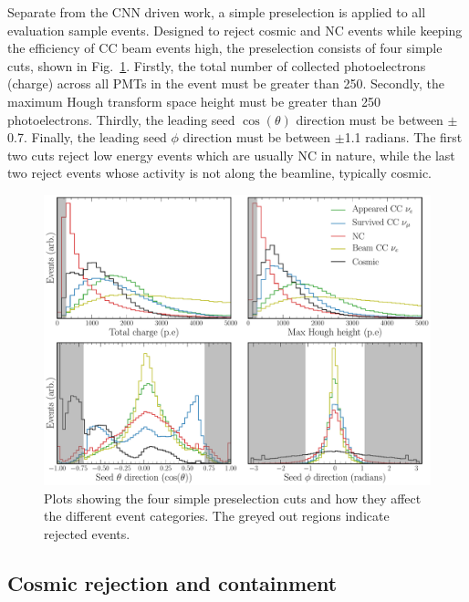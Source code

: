 Separate from the CNN driven work, a simple preselection is applied to all evaluation sample
events. Designed to reject cosmic and NC events while keeping the efficiency of CC beam events
high, the preselection consists of four simple cuts, shown in Fig.~\ref{fig:explore_simple_cuts}.
Firstly, the total number of collected photoelectrons (charge) across all PMTs in the event must
be greater than 250. Secondly, the maximum Hough transform space height must be greater than 250
photoelectrons. Thirdly, the leading seed $\cos(\theta)$ direction must be between $\pm$0.7.
Finally, the leading seed $\phi$ direction must be between $\pm$1.1 radians. The first two cuts
reject low energy events which are usually NC in nature, while the last two reject events whose
activity is not along the beamline, typically cosmic.

\begin{figure} %
    \includegraphics[width=\textwidth]{diagrams/7-results/explore_simple_cuts.pdf}
    \caption[Plots detailing evaluation sample preselection cuts]
    {Plots showing the four simple preselection cuts and how they affect the different event
        categories. The greyed out regions indicate rejected events.}
    \label{fig:explore_simple_cuts}
\end{figure}

\subsection{Cosmic rejection and containment} %
\label{sec:results_eval_cosmic} %

